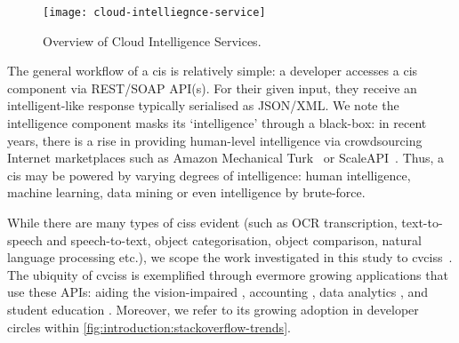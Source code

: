 \begin{figure}[h!]
\centering
\caption[Overview of cloud intelligence services]{Overview of Cloud Intelligence Services.}
\label{fig:introduction:cloud-intelliegnce-service}
\texttt{[image: cloud-intelliegnce-service]}
\end{figure}

 
The general workflow of a \gls{cis} is relatively simple: a developer accesses a \gls{cis} component via REST/SOAP API(s). For their given input, they receive an intelligent-like response typically serialised as JSON/XML. We note the intelligence component masks its `intelligence' through a black-box: in recent years, there is a rise in providing human-level intelligence via crowdsourcing Internet marketplaces such as Amazon Mechanical Turk~\citep{MTurk:Home} or ScaleAPI~\citep{ScaleAPI:Home}. Thus, a \gls{cis} may be powered by varying degrees of intelligence: human intelligence, machine learning, data mining or even intelligence by brute-force.

While there are many types of \glspl{cis} evident (such as OCR transcription, text-to-speech and speech-to-text, object categorisation, object comparison, natural language processing etc.), we scope the work investigated in this study to \glspl{cvcis}~\citep{GoogleCloud:Home,Azure:Home,AWS:Home,Pixlab:Home,IBM:Home,Cloudsight:Home,Clarifai:Home,DeepAI:Home,Imagaa:Home,Talkwaler:Home,Kairos:Home,Cognitec:Home,Affectiva:Home}. The ubiquity of \glspl{cvcis} is exemplified through evermore growing applications that use these APIs: aiding the vision-impaired \citep{Reis:2018cp,daMotaSilveira:2017vp}, accounting  \citep{Marshall:2018uj}, data analytics \citep{Iyengar:2017fb}, and student education \citep{Dibia:2017iy}. Moreover, we refer to its growing adoption in developer circles within \cref{fig:introduction:stackoverflow-trends}.
